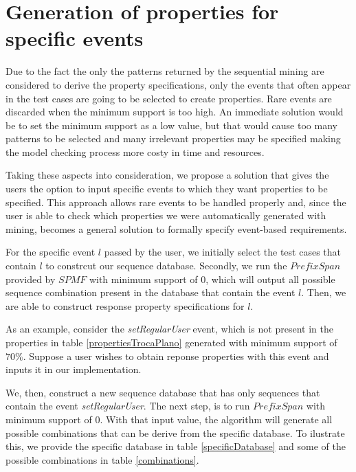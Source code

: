 \section{Generation of properties for specific events}
\label{sec-genpropspecific}

Due to the fact the only the patterns returned by the sequential mining are considered to derive the property specifications, only the events that often appear in the test cases are going to be selected to create properties. Rare events are discarded when the minimum support is too high. An immediate solution would be to set the minimum support as a low value, but that would cause too many patterns to be selected and many irrelevant properties may be specified making the model checking process more costy in time and resources.

Taking these aspects into consideration, we propose a solution that gives the users the option to input specific events to which they want properties to be specified. This approach allows rare events to be handled properly and, since the user is able to check which properties we were automatically generated with mining, becomes a general solution to formally specify event-based requirements.

For the specific event $l$ passed by the user, we initially select the test cases that contain $l$ to constrcut our sequence database. Secondly, we run the $PrefixSpan$ provided by $SPMF$ with minimum support of $0$, which will output all possible sequence combination present in the database that contain the event $l$. Then, we are able to construct response property specifications for $l$.

As an example, consider the \textit{setRegularUser} event, which is not present in the properties in table \ref{propertiesTrocaPlano} generated with minimum support of $70\%$. Suppose a user wishes to obtain reponse properties with this event and inputs it in our implementation.

We, then, construct a new sequence database that has only sequences that contain the event \textit{setRegularUser}. The next step, is to run $PrefixSpan$ with minimum support of 0. With that input value, the algorithm will generate all possible combinations that can be derive from the specific database. To ilustrate this, we provide the specific database in table \ref{specificDatabase} and some of the possible combinations in table \ref{combinations}.

